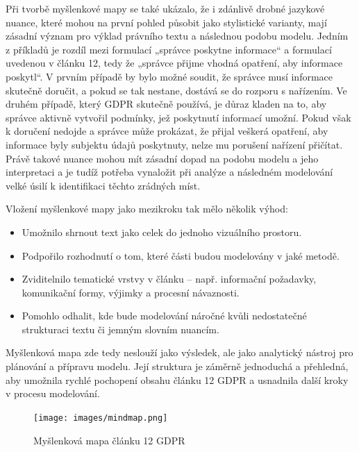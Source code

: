 Při tvorbě myšlenkové mapy se také ukázalo, že i zdánlivě drobné jazykové nuance, které mohou na první pohled působit jako stylistické varianty, mají zásadní význam pro výklad právního textu a následnou podobu modelu. Jedním z příkladů je rozdíl mezi formulací „správce poskytne informace“ a formulací uvedenou v článku 12, tedy že „správce přijme vhodná opatření, aby informace poskytl“. V prvním případě by bylo možné soudit, že správce musí informace skutečně doručit, a pokud se tak nestane, dostává se do rozporu s nařízením. Ve druhém případě, který GDPR skutečně používá, je důraz kladen na to, aby správce aktivně vytvořil podmínky, jež poskytnutí informací umožní. Pokud však k doručení nedojde a správce může prokázat, že přijal veškerá opatření, aby informace byly subjektu údajů poskytnuty, nelze mu porušení nařízení přičítat. Právě takové nuance mohou mít zásadní dopad na podobu modelu a jeho interpretaci a je tudíž potřeba vynaložit při analýze a následném modelování velké úsilí k identifikaci těchto zrádných míst.

Vložení myšlenkové mapy jako mezikroku tak mělo několik výhod:
\begin{itemize}
\item Umožnilo shrnout text jako celek do jednoho vizuálního prostoru.
\item Podpořilo rozhodnutí o tom, které části budou modelovány v jaké metodě.
\item Zviditelnilo tematické vrstvy v článku – např. informační požadavky, komunikační formy, výjimky a procesní návaznosti.
\item Pomohlo odhalit, kde bude modelování náročné kvůli nedostatečné strukturaci textu či jemným slovním nuancím.
\end{itemize}

\noindent Myšlenková mapa zde tedy neslouží jako výsledek, ale jako analytický nástroj pro plánování a přípravu modelu. Její struktura je záměrně jednoduchá a přehledná, aby umožnila rychlé pochopení obsahu článku 12 GDPR a usnadnila další kroky v procesu modelování.

\begin{figure}[H]
\centering
\texttt{[image: images/mindmap.png]}
\caption{Myšlenková mapa článku 12 GDPR}
\label{fig:mindmap}
\end{figure}

